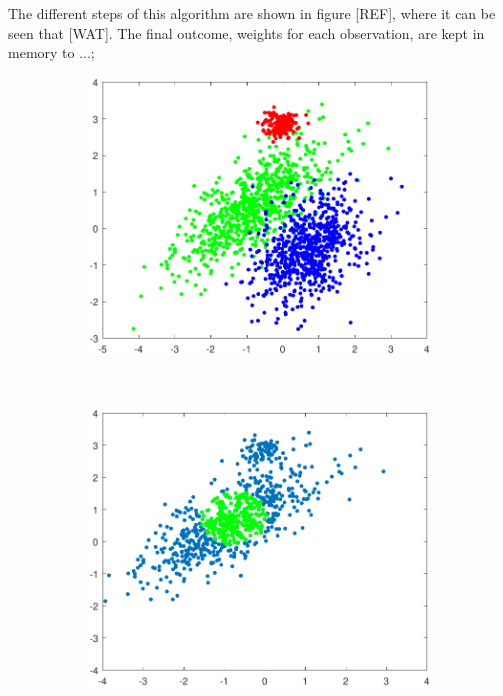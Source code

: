 \documentclass[preprint,12pt]{elsarticle}
\begin{document}
The different steps of this algorithm are shown in figure [REF], where it can be seen that [WAT]. The final outcome, weights for each observation, are kept in memory to ...;


\begin{figure}[ht!]
	\centering
	\begin{subfigure}[b]{0.5\linewidth}
		\centering\includegraphics[width=1\linewidth]{figures/kcstep/datamodel.pdf}
		\caption{\label{fig:dmodel}} 
	\end{subfigure} \\
	\begin{subfigure}[b]{0.45\linewidth}
		\centering\includegraphics[width=1\linewidth]{figures/kcstep/c1input.pdf}

\end{subfigure}
\end{figure}
\end{document}
